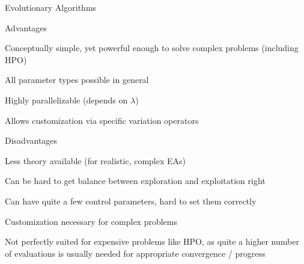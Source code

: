 \begin{frame}{Evolutionary Algorithms}

  \begin{blocki}{Advantages}
    \item Conceptually simple, yet powerful enough to solve complex problems (including HPO)
    \item All parameter types possible in general
    \item Highly parallelizable (depends on $\lambda$)
    \item Allows customization via specific variation operators
    \end{blocki}

    \begin{blocki}{Disadvantages}
      \item Less theory available (for realistic, complex EAs)
    \item Can be hard to get balance between exploration and exploitation right
        \item Can have quite a few control parameters, hard to set them correctly\\
        \item Customization necessary for complex problems
        \item Not perfectly suited for expensive problems like HPO, 
            as quite a higher number of evaluations is usually
            needed for appropriate convergence / progress
    \end{blocki}

\end{frame}







